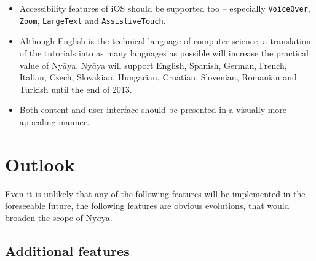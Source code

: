 \begin{itemize}

\item Accessibility features of iOS should be supported too – especially 
\verb+VoiceOver+, \verb+Zoom+, \verb+LargeText+ and \verb+AssistiveTouch+.

\item Although English is the technical language of computer science,
a translation of the tutorials into as many languages as possible will increase the practical value of Ny$\bar{a}$ya.
Ny$\bar{a}$ya will support English, Spanish, German, French, Italian, Czech, Slovakian, Hungarian, Croatian, Slovenian, Romanian and Turkish
until the end of 2013.
%
%


\item Both content and user interface should be presented in a visually more appealing manner.

\end{itemize}
%
%
%
%
%

\section{Outlook}

Even it is unlikely that any of the following features will be implemented in the foreseeable future, 
the following features are obvious evolutions, that would broaden the scope of Ny$\bar{a}$ya.

\subsection{Additional features}

